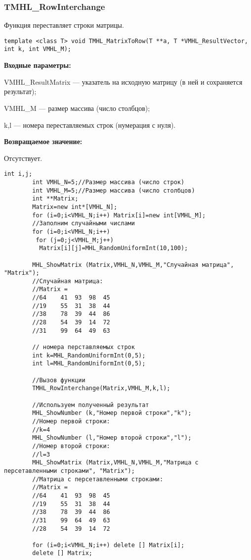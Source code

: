 \documentclass[a4paper,12pt]{article}
\begin{document}
\subsubsection{TMHL\_RowInterchange}\label{TMHL_RowInterchange}

Функция переставляет строки матрицы.


\begin{lstlisting}[label=code_syntax_TMHL_RowInterchange,caption=Синтаксис]
template <class T> void TMHL_MatrixToRow(T **a, T *VMHL_ResultVector, int k, int VMHL_M);
\end{lstlisting}

\textbf{Входные параметры:}  
 
VMHL\_ResultMatrix --- указатель на исходную матрицу (в ней и сохраняется результат);
 
VMHL\_M --- размер массива (число столбцов);
 
k,l --- номера переставляемых строк (нумерация с нуля).

\textbf{Возвращаемое значение:}

Отсутствует.


\begin{lstlisting}[label=code_use_TMHL_RowInterchange,caption=Пример использования]
        int i,j;
        int VMHL_N=5;//Размер массива (число строк)
        int VMHL_M=5;//Размер массива (число столбцов)
        int **Matrix;
        Matrix=new int*[VMHL_N];
        for (i=0;i<VMHL_N;i++) Matrix[i]=new int[VMHL_M];
        //Заполним случайными числами
        for (i=0;i<VMHL_N;i++)
         for (j=0;j<VMHL_M;j++)
          Matrix[i][j]=MHL_RandomUniformInt(10,100);

        MHL_ShowMatrix (Matrix,VMHL_N,VMHL_M,"Случайная матрица", "Matrix");
        //Случайная матрица:
        //Matrix =	
        //64	41	93	98	45
        //19	55	31	38	44
        //38	78	39	44	86
        //28	54	39	14	72
        //31	99	64	49	63

        // номера перставляемых строк
        int k=MHL_RandomUniformInt(0,5);
        int l=MHL_RandomUniformInt(0,5);

        //Вызов функции
        TMHL_RowInterchange(Matrix,VMHL_M,k,l);

        //Используем полученный результат
        MHL_ShowNumber (k,"Номер первой строки","k");
        //Номер первой строки:
        //k=4
        MHL_ShowNumber (l,"Номер второй строки","l");
        //Номер второй строки:
        //l=3
        MHL_ShowMatrix (Matrix,VMHL_N,VMHL_M,"Матрица с персетавленными строками", "Matrix");
        //Матрица с персетавленными строками:
        //Matrix =	
        //64	41	93	98	45
        //19	55	31	38	44
        //38	78	39	44	86
        //31	99	64	49	63
        //28	54	39	14	72

        for (i=0;i<VMHL_N;i++) delete [] Matrix[i];
        delete [] Matrix;
\end{lstlisting}
\end{document}
